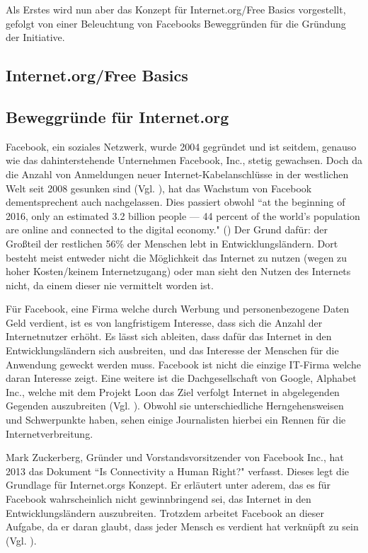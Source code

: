 \documentclass{article}
\begin{document}
Als Erstes wird nun aber das Konzept für Internet.org/Free Basics vorgestellt, gefolgt von einer Beleuchtung von Facebooks Beweggründen für die Gründung der Initiative.

\subsection{Internet.org/Free Basics}

\subsection{Beweggründe für Internet.org}
Facebook, ein soziales Netzwerk, wurde 2004 gegründet und ist seitdem, genauso wie das dahinterstehende Unternehmen Facebook, Inc., stetig gewachsen. 
Doch da die Anzahl von Anmeldungen neuer Internet-Kabelanschlüsse in der westlichen Welt seit 2008 gesunken sind
(Vgl. \cite{ICTslowingDown}), hat das Wachstum von Facebook dementsprechent auch nachgelassen.
Dies passiert obwohl ``at the beginning of 2016, only an estimated 3.2 billion people — 44 percent of the world’s population are online and connected to the digital economy." (\cite[7]{connectWorld})
Der Grund dafür: der Großteil der restlichen 56\% der Menschen lebt in Entwicklungsländern. Dort besteht meist entweder nicht die Möglichkeit das Internet zu nutzen (wegen zu hoher Kosten/keinem Internetzugang) oder man sieht den Nutzen des Internets nicht, da einem dieser nie vermittelt worden ist.

\medskip

Für Facebook, eine Firma welche durch Werbung und personenbezogene Daten Geld verdient, ist es von langfristigem Interesse, dass sich die Anzahl der Internetnutzer erhöht.
Es lässt sich ableiten, dass dafür das Internet in den Entwicklungsländern sich ausbreiten, und das Interesse der Menschen für die Anwendung geweckt werden muss.
Facebook ist nicht die einzige IT-Firma welche daran Interesse  zeigt.
Eine weitere ist die Dachgesellschaft von Google, Alphabet Inc., welche mit dem Projekt Loon das Ziel verfolgt Internet in abgelegenden Gegenden auszubreiten (Vgl. \cite{projectLoon}). %
Obwohl sie unterschiedliche Herngehensweisen und Schwerpunkte haben, sehen einige Journalisten hierbei ein Rennen für die Internetverbreitung. 

\medskip

Mark Zuckerberg, Gründer und Vorstandsvorsitzender von Facebook Inc., hat 2013 das Dokument ``Is Connectivity a Human Right?" verfasst.
Dieses legt die Grundlage für Internet.orgs Konzept.
Er erläutert unter aderem, das es für Facebook wahrscheinlich nicht gewinnbringend sei, das Internet in den Entwicklungsländern auszubreiten.
Trotzdem arbeitet Facebook an dieser Aufgabe, da er daran glaubt, dass jeder Mensch es verdient hat verknüpft zu sein (Vgl. \cite[1]{HumanRight}).
\end{document}
